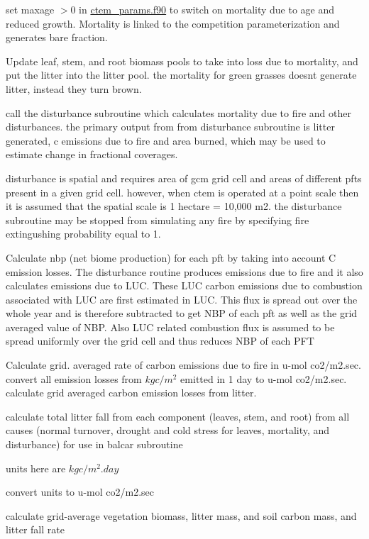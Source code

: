 set maxage $>$0 in \hyperlink{ctem__params_8f90}{ctem\+\_\+params.\+f90} to switch on mortality due to age and reduced growth. Mortality is linked to the competition parameterization and generates bare fraction.

Update leaf, stem, and root biomass pools to take into loss due to mortality, and put the litter into the litter pool. the mortality for green grasses doesn\textquotesingle{}t generate litter, instead they turn brown.

call the disturbance subroutine which calculates mortality due to fire and other disturbances. the primary output from from disturbance subroutine is litter generated, c emissions due to fire and area burned, which may be used to estimate change in fractional coverages.

disturbance is spatial and requires area of gcm grid cell and areas of different pfts present in a given grid cell. however, when ctem is operated at a point scale then it is assumed that the spatial scale is 1 hectare = 10,000 m2. the disturbance subroutine may be stopped from simulating any fire by specifying fire extingushing probability equal to 1.

Calculate nbp (net biome production) for each pft by taking into account C emission losses. The disturbance routine produces emissions due to fire and it also calculates emissions due to L\+U\+C. These L\+U\+C carbon emissions due to combustion associated with L\+U\+C are first estimated in L\+U\+C. This flux is spread out over the whole year and is therefore subtracted to get N\+B\+P of each pft as well as the grid averaged value of N\+B\+P. Also L\+U\+C related combustion flux is assumed to be spread uniformly over the grid cell and thus reduces N\+B\+P of each P\+F\+T

Calculate grid. averaged rate of carbon emissions due to fire in u-\/mol co2/m2.\+sec. convert all emission losses from $kg c/m^2$ emitted in 1 day to u-\/mol co2/m2.\+sec. calculate grid averaged carbon emission losses from litter.

calculate total litter fall from each component (leaves, stem, and root) from all causes (normal turnover, drought and cold stress for leaves, mortality, and disturbance) for use in balcar subroutine

units here are $kg c/m^2 .day$

convert units to u-\/mol co2/m2.\+sec

calculate grid-\/average vegetation biomass, litter mass, and soil carbon mass, and litter fall rate

